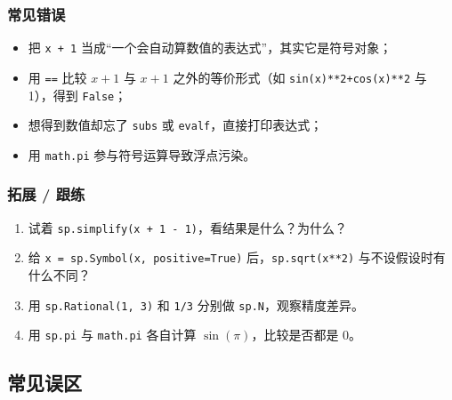 \subsubsection{常见错误}\label{ux5e38ux89c1ux9519ux8bef-11}

\begin{itemize}
\tightlist
\item
  把 \texttt{x\ +\ 1}
  当成``一个会自动算数值的表达式''，其实它是符号对象；
\item
  用 \texttt{==} 比较 \(x+1\) 与 \(x+1\) 之外的等价形式（如
  \texttt{sin(x)**2+cos(x)**2} 与 1），得到 \texttt{False}；
\item
  想得到数值却忘了 \texttt{subs} 或 \texttt{evalf}，直接打印表达式；
\item
  用 \texttt{math.pi} 参与符号运算导致浮点污染。
\end{itemize}

\subsubsection{拓展 / 跟练}\label{ux62d3ux5c55-ux8ddfux7ec3}

\begin{enumerate}
\def\labelenumi{\arabic{enumi}.}
\tightlist
\item
  试着 \texttt{sp.simplify(x\ +\ 1\ -\ 1)}，看结果是什么？为什么？
\item
  给
  \texttt{x\ =\ sp.Symbol(\textquotesingle{}x\textquotesingle{},\ positive=True)}
  后，\texttt{sp.sqrt(x**2)} 与不设假设时有什么不同？
\item
  用 \texttt{sp.Rational(1,\ 3)} 和 \texttt{1/3} 分别做
  \texttt{sp.N}，观察精度差异。
\item
  用 \texttt{sp.pi} 与 \texttt{math.pi} 各自计算
  \(\sin(\pi)\)，比较是否都是 0。
\end{enumerate}

\subsection{常见误区}\label{ux5e38ux89c1ux8befux533a-5}


